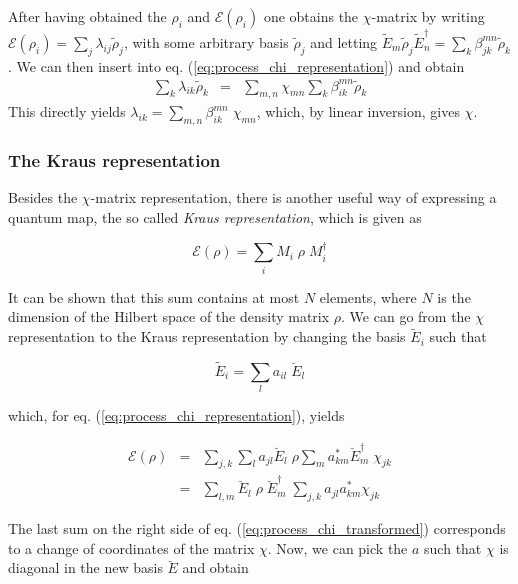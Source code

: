 After having obtained the $\rho_i$ and $\mathcal{E}(\rho_i)$ one obtains the $\chi$-matrix by writing $\mathcal{E}(\rho_i) = \sum_j \lambda_{ij} \tilde{\rho}_j$, with some arbitrary basis $\tilde{\rho}_j$ and
letting $\tilde{E}_m \tilde{\rho}_j \tilde{E}_n^\dagger = \sum_k \beta_{jk}^{mn}\tilde{\rho}_k$. We can then insert into eq. (\ref{eq:process_chi_representation}) and obtain
\begin{eqnarray}
\sum\limits_k \lambda_{ik} \tilde{\rho}_k & = & \sum\limits_{m,n} \chi_{mn} \sum\limits_k \beta_{ik}^{mn} \tilde{\rho}_k  
\end{eqnarray}
This directly yields $\lambda_{ik} = \sum_{m,n}\beta_{ik}^{mn}\; \chi_{mn}$, which, by linear inversion,  gives $\chi$.

\subsubsection{The Kraus representation}

Besides the $\chi$-matrix representation, there is another useful way of expressing a quantum map, the so called {\it Kraus representation}, which is given as

\begin{equation}
 \mathcal{E}(\rho) = \sum\limits_i M_i \; \rho \; M_i^\dagger \label{eq:process_kraus_representation}
\end{equation}

It can be shown \citep{haroche_exploring_2006} that this sum contains at most $N$ elements, where $N$ is the dimension of the Hilbert space of the density matrix $\rho$. We can go from the $\chi$ representation to the Kraus representation by changing the basis $\tilde{E}_i$ such that

\begin{equation}
	\tilde{E}_i = \sum\limits_l a_{il}\; \breve{E}_l
\end{equation}

which, for eq. (\ref{eq:process_chi_representation}), yields

\begin{eqnarray}
 \mathcal{E}(\rho) & = & \sum\limits_{j,k} \sum\limits_l a_{jl} \breve{E}_l \; \rho \sum\limits_m a_{km}^* \breve{E}_m^\dagger \; \chi_{jk} \\
 & = & \sum\limits_{l,m}  \breve{E}_l \; \rho \; \breve{E}_m^\dagger \; \sum\limits_{j,k} a_{jl} a_{km}^* \chi_{jk} \label{eq:process_chi_transformed}
\end{eqnarray}

The last sum on the right side of eq. (\ref{eq:process_chi_transformed}) corresponds to a change of coordinates of the matrix $\chi$. Now, we can pick the $a$ such that $\chi$ is diagonal in the new basis $\breve{E}$ and obtain

